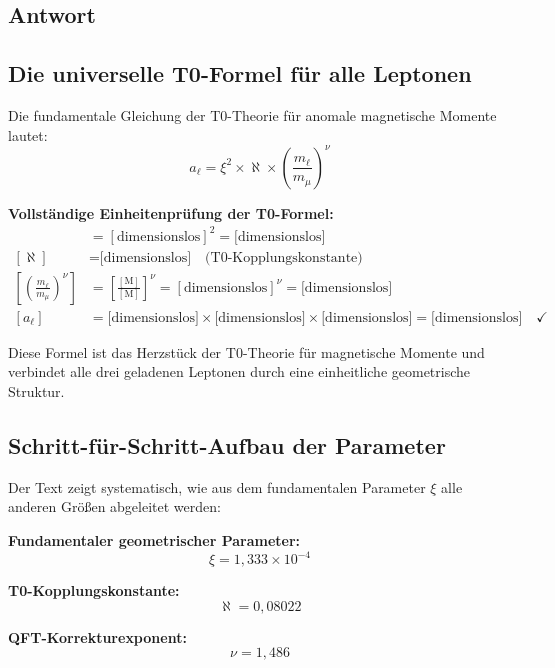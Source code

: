 \documentclass[12pt,a4paper]{article}
\newcommand{\nulep}{\nu}
\theoremstyle{remark}
\newenvironment{answer}{\subsection*{Antwort}}{\vspace{1em}}
\begin{document}
\begin{answer}
	\subsection{Die universelle T0-Formel für alle Leptonen}
	
	Die fundamentale Gleichung der T0-Theorie für anomale magnetische Momente lautet:
	\begin{equation}
		a_\ell = \xi^2 \times \aleph \times \left(\frac{m_\ell}{m_\mu}\right)^\nulep
	\end{equation}
	
	\begin{units}
		\textbf{Vollständige Einheitenprüfung der T0-Formel:}
		\begin{align}
			[\xi^2] &= [\text{dimensionslos}]^2 = \text{[dimensionslos]} \\
			[\aleph] &= \text{[dimensionslos]} \quad \text{(T0-Kopplungskonstante)} \\
			\left[\left(\frac{m_\ell}{m_\mu}\right)^\nulep\right] &= \left[\frac{[\text{M}]}{[\text{M}]}\right]^\nulep = [\text{dimensionslos}]^\nulep = \text{[dimensionslos]} \\
			[a_\ell] &= \text{[dimensionslos]} \times \text{[dimensionslos]} \times \text{[dimensionslos]} = \text{[dimensionslos]} \quad \checkmark
		\end{align}
	\end{units}
	
	Diese Formel ist das Herzstück der T0-Theorie für magnetische Momente und verbindet alle drei geladenen Leptonen durch eine einheitliche geometrische Struktur.
	
	\subsection{Schritt-für-Schritt-Aufbau der Parameter}
	
	Der Text zeigt systematisch, wie aus dem fundamentalen Parameter $\xi$ alle anderen Größen abgeleitet werden:
	
	\textbf{Fundamentaler geometrischer Parameter:}
	\begin{equation}
		\xi = 1{,}333 \times 10^{-4}
	\end{equation}
	
	\textbf{T0-Kopplungskonstante:}
	\begin{equation}
		\aleph = 0{,}08022
	\end{equation}
	
	\textbf{QFT-Korrekturexponent:}
	\begin{equation}
		\nulep = 1{,}486
	\end{equation}
	

\end{answer}
\end{document}
